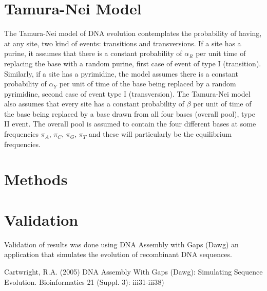 \documentclass[12pt,twoside]{article}
\begin{document}
\section{Tamura-Nei Model}
The Tamura-Nei model of DNA evolution contemplates the probability of having, at any site, two kind of events: transitions and transversions. If a site has a purine, it assumes that there is a constant probability of $\alpha_{R}$ per unit time of replacing the base with a random purine, first case of event of type I (transition). Similarly, if a site has a pyrimidine, the model assumes there is a constant probability of $\alpha_{Y}$ per unit of time of the base being replaced by a random pyrimidine, second case of event type I (transversion). The Tamura-Nei model also assumes that every site has a constant probability of $\beta$ per unit of time of the base being replaced by a base drawn from all four bases (overall pool), type II event. The overall pool is assumed to contain the four different bases at some frequencies $\pi_{A}$, $\pi_{C}$, $\pi_{G}$, $\pi_{T}$ and these will particularly be the equilibrium frequencies.

\section{Methods}

\section{Validation}
Validation of results was done using DNA Assembly with Gaps (Dawg) \cite{DAWG} an application that simulates the evolution of recombinant DNA sequences.


\begin{thebibliography}{9}
Cartwright, R.A. (2005) DNA Assembly With Gaps (Dawg): Simulating Sequence
Evolution.  Bioinformatics 21 (Suppl. 3): iii31-iii38)

\end{thebibliography}
\end{document}
